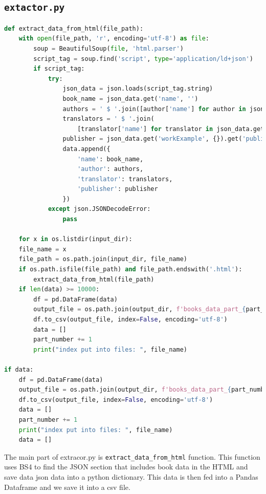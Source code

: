 \documentclass{solutionclass} %
\def\co#1{\texttt{#1}}
\begin{document}
\subsection*{\co{extactor.py}}
\begin{lstlisting}[language=Python]
    def extract_data_from_html(file_path):
    with open(file_path, 'r', encoding='utf-8') as file:
        soup = BeautifulSoup(file, 'html.parser')
        script_tag = soup.find('script', type='application/ld+json')
        if script_tag:
            try:
                json_data = json.loads(script_tag.string)
                book_name = json_data.get('name', '')
                authors = ' $ '.join([author['name'] for author in json_data.get('author', [])])
                translators = ' $ '.join(
                    [translator['name'] for translator in json_data.get('workExample', {}).get('translator', [])])
                publisher = json_data.get('workExample', {}).get('publisher', {}).get('name', '')
                data.append({
                    'name': book_name,
                    'author': authors,
                    'translator': translators,
                    'publisher': publisher
                })
            except json.JSONDecodeError:
                pass

    for x in os.listdir(input_dir):
    file_name = x
    file_path = os.path.join(input_dir, file_name)
    if os.path.isfile(file_path) and file_path.endswith('.html'):
        extract_data_from_html(file_path)
    if len(data) >= 10000:
        df = pd.DataFrame(data)
        output_file = os.path.join(output_dir, f'books_data_part_{part_number}.csv')
        df.to_csv(output_file, index=False, encoding='utf-8')
        data = []
        part_number += 1
        print("index put into files: ", file_name)

if data:
    df = pd.DataFrame(data)
    output_file = os.path.join(output_dir, f'books_data_part_{part_number}.csv')
    df.to_csv(output_file, index=False, encoding='utf-8')
    data = []
    part_number += 1
    print("index put into files: ", file_name)
    data = []
\end{lstlisting}

\begin{solution}
The main part of extracor.py is \co{extract\_data\_from\_html} function. This function uses BS4 to find the JSON section that includes book data in the HTML and save data json data into a python dictionary. This data is then fed into a Pandas Dataframe and we save it into a csv file.


\end{solution}
\end{document}
